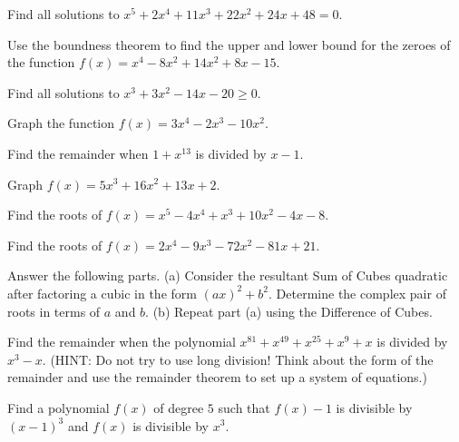 \documentclass[lang=en,11pt]{elegantbook}
\begin{document}
\begin{reviewset}
\item Find all solutions to $x^5+2x^4+11x^3+22x^2+24x+48=0$. \vspace{1mm}
\item Use the boundness theorem to find the upper and lower bound for the zeroes of the function $f(x)=x^4-8x^2+14x^2+8x-15$. \vspace{1mm}
\item Find all solutions to $x^3+3x^2-14x-20\geq 0$. \vspace{1mm}
\item Graph the function $f(x)=3x^4-2x^3-10x^2$. \vspace{1mm}
\item Find the remainder when $1+x^{13}$ is divided by $x-1$. \vspace{1mm}
\item Graph $f(x)=5x^3+16x^2+13x+2$. \vspace{1mm}
\end{reviewset}
\begin{challengeset}
\item Find the roots of $f(x)=x^5-4x^4+x^3+10x^2-4x-8$. \vspace{1mm}
\item Find the roots of $f(x)=2x^4-9x^3-72x^2-81x+21$. \vspace{1mm}
\item Answer the following parts. \newline
(a) Consider the resultant Sum of Cubes quadratic after factoring a cubic in the form $(ax)^2+b^2$. Determine the complex pair of roots in terms of $a$ and $b$. \newline 
(b) Repeat part (a) using the Difference of Cubes. \vspace{1mm}
\item Find the remainder when the polynomial $x^{81}+x^{49}+x^{25}+x^{9}+x$ is divided by $x^3-x$. (HINT: Do not try to use long division! Think about the form of the remainder and use the remainder theorem to set up a system of equations.) \vspace{1mm}
\item Find a polynomial $f(x)$ of degree $5$ such that $f(x)-1$ is divisible by $(x-1)^3$ and $f(x)$ is divisible by $x^3$. \vspace{1mm}
\end{challengeset}
\end{document}
